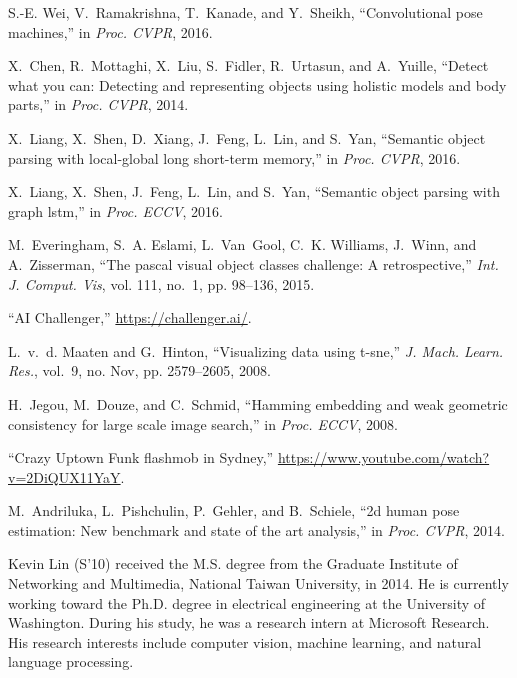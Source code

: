 \documentclass[final]{IEEEtran}
\begin{document}
{\begin{minipage}{\textwidth}
\begin{thebibliography}{1}
S.-E. Wei, V.~Ramakrishna, T.~Kanade, and Y.~Sheikh, ``Convolutional pose
  machines,'' in \emph{Proc. CVPR}, 2016.

X.~Chen, R.~Mottaghi, X.~Liu, S.~Fidler, R.~Urtasun, and A.~Yuille, ``Detect
  what you can: Detecting and representing objects using holistic models and
  body parts,'' in \emph{Proc. CVPR}, 2014.

X.~Liang, X.~Shen, D.~Xiang, J.~Feng, L.~Lin, and S.~Yan, ``Semantic object
  parsing with local-global long short-term memory,'' in \emph{Proc. CVPR},
  2016.

X.~Liang, X.~Shen, J.~Feng, L.~Lin, and S.~Yan, ``Semantic object parsing with
  graph lstm,'' in \emph{Proc. ECCV}, 2016.

M.~Everingham, S.~A. Eslami, L.~Van~Gool, C.~K. Williams, J.~Winn, and
  A.~Zisserman, ``The pascal visual object classes challenge: A
  retrospective,'' \emph{Int. J. Comput. Vis}, vol. 111, no.~1, pp. 98--136,
  2015.

``{AI Challenger},'' \url{https://challenger.ai/}.

L.~v.~d. Maaten and G.~Hinton, ``Visualizing data using t-sne,'' \emph{J. Mach.
  Learn. Res.}, vol.~9, no. Nov, pp. 2579--2605, 2008.

H.~Jegou, M.~Douze, and C.~Schmid, ``Hamming embedding and weak geometric
  consistency for large scale image search,'' in \emph{Proc. ECCV}, 2008.

``{Crazy Uptown Funk flashmob in Sydney},''
  \url{https://www.youtube.com/watch?v=2DiQUX11YaY}.

M.~Andriluka, L.~Pishchulin, P.~Gehler, and B.~Schiele, ``2d human pose
  estimation: New benchmark and state of the art analysis,'' in \emph{Proc.
  CVPR}, 2014.

\end{thebibliography}









\begin{IEEEbiography}{Kevin Lin} (S'10) received the M.S. degree from the Graduate Institute of Networking and Multimedia, National Taiwan University, in 2014. He is currently working toward the Ph.D. degree in electrical engineering at the University of Washington. During his study, he was a research intern at Microsoft Research. His research interests include computer vision, machine learning, and natural language processing.
\end{IEEEbiography}



\end{minipage}}
\end{document}
